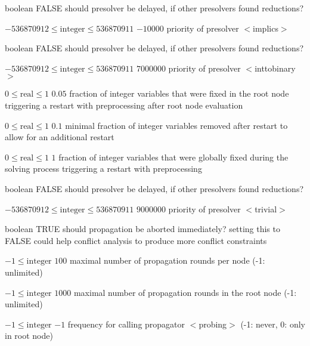 %
{boolean}%
{FALSE}%
{should presolver be delayed, if other presolvers found reductions?}%
{}

%
{$-536870912\leq\textrm{integer}\leq536870911$}%
{$-10000$}%
{priority of presolver $<$implics$>$}%
{}

%
{boolean}%
{FALSE}%
{should presolver be delayed, if other presolvers found reductions?}%
{}

%
{$-536870912\leq\textrm{integer}\leq536870911$}%
{$7000000$}%
{priority of presolver $<$inttobinary$>$}%
{}

%
{$0\leq\textrm{real}\leq1$}%
{$0.05$}%
{fraction of integer variables that were fixed in the root node triggering a restart with preprocessing after root node evaluation}%
{}

%
{$0\leq\textrm{real}\leq1$}%
{$0.1$}%
{minimal fraction of integer variables removed after restart to allow for an additional restart}%
{}

%
{$0\leq\textrm{real}\leq1$}%
{$1$}%
{fraction of integer variables that were globally fixed during the solving process triggering a restart with preprocessing}%
{}

%
{boolean}%
{FALSE}%
{should presolver be delayed, if other presolvers found reductions?}%
{}

%
{$-536870912\leq\textrm{integer}\leq536870911$}%
{$9000000$}%
{priority of presolver $<$trivial$>$}%
{}

%
{boolean}%
{TRUE}%
{should propagation be aborted immediately? setting this to FALSE could help conflict analysis to produce more conflict constraints}%
{}

%
{$-1\leq\textrm{integer}$}%
{$100$}%
{maximal number of propagation rounds per node (-1: unlimited)}%
{}

%
{$-1\leq\textrm{integer}$}%
{$1000$}%
{maximal number of propagation rounds in the root node (-1: unlimited)}%
{}

%
{$-1\leq\textrm{integer}$}%
{$-1$}%
{frequency for calling propagator $<$probing$>$ (-1: never, 0: only in root node)}%
{}

